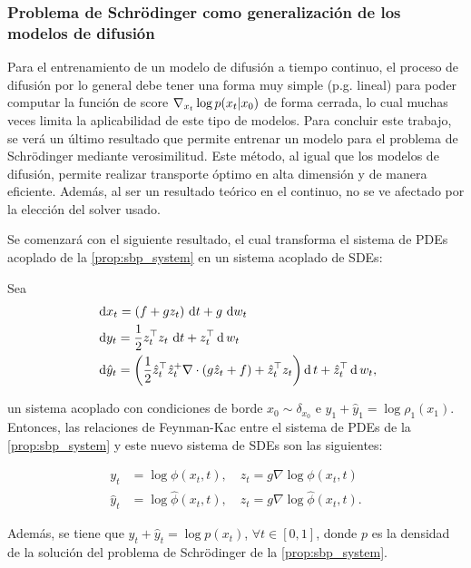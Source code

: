 \subsubsection{Problema de Schrödinger como generalización de los modelos de difusión}

Para el entrenamiento de un modelo de difusión a tiempo continuo, el proceso de difusión por lo general debe tener una forma muy simple (p.g. lineal) para poder computar la función de score $\nabla_{x_t} \log p(x_t|x_0)$ de forma cerrada, lo cual muchas veces limita la aplicabilidad de este tipo de modelos. Para concluir este trabajo, se verá un último resultado que permite entrenar un modelo para el problema de Schrödinger mediante verosimilitud. Este método, al igual que los modelos de difusión, permite realizar transporte óptimo en alta dimensión y de manera eficiente. Además, al ser un resultado teórico en el continuo, no se ve afectado por la elección del solver usado.

Se comenzará con el siguiente resultado, el cual transforma el sistema de PDEs acoplado de la \autoref{prop:sbp_system} en un sistema acoplado de SDEs:

\begin{teo}
	\label{teo:feynman_kac_sbp}

	Sea
	\begin{align*}
		&\,\operatorname{d}\! x_t = (f+gz_t)\,\operatorname{d}\! t + g\,\operatorname{d}\! w_t\\
		&\,\operatorname{d}\! y_t = \frac{1}{2} z_t^\top z_t \,\operatorname{d}\! t + z_t^\top \operatorname{d} w_t\\
		&\,\operatorname{d}\! \hat y_t = \left(\frac{1}{2}\hat z_t^\top \hat z_t^ + \nabla\cdot(g\hat z_t + f) + \hat z_t^\top z_t\right)\operatorname{d} t + \hat z_t^\top \operatorname{d} w_t,
	\end{align*}

	un sistema acoplado con condiciones de borde $x_0\sim\delta_{x_0}$ e $y_1+\hat y_1 = \log \rho_1(x_1)$. Entonces, las relaciones de Feynman-Kac entre el sistema de PDEs de la \autoref{prop:sbp_system} y este nuevo sistema de SDEs son las siguientes:

	\begin{align*}
		y_t &= \log \phi(x_t,t),\quad z_t = g\nabla\log\phi(x_t,t)\\
		\hat y_t &= \log \hat\phi(x_t,t),\quad \hat z_t = g\nabla\log\hat\phi(x_t,t).
	\end{align*}

	Además, se tiene que $y_t + \hat y_t = \log p(x_t)$, $\forall t\in[0,1]$, donde $p$ es la densidad de la solución del problema de Schrödinger de la \autoref{prop:sbp_system}.
	
\end{teo}

